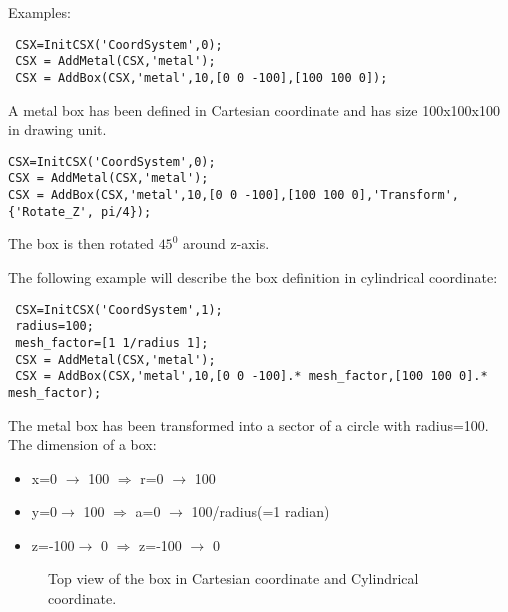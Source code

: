 \begin{FontDescr}{Examples:}

\begin{lstlisting}
 CSX=InitCSX('CoordSystem',0);
 CSX = AddMetal(CSX,'metal'); 
 CSX = AddBox(CSX,'metal',10,[0 0 -100],[100 100 0]);
\end{lstlisting} 

A metal box has been defined in Cartesian coordinate and has size 100x100x100 in drawing unit.

\begin{lstlisting}
CSX=InitCSX('CoordSystem',0);
CSX = AddMetal(CSX,'metal'); 
CSX = AddBox(CSX,'metal',10,[0 0 -100],[100 100 0],'Transform', {'Rotate_Z', pi/4});  
\end{lstlisting}  
The box is then rotated $45^{0}$ around z-axis.   


The following example will describe the box definition in cylindrical coordinate: 

\begin{lstlisting} 
 CSX=InitCSX('CoordSystem',1);
 radius=100;
 mesh_factor=[1 1/radius 1];
 CSX = AddMetal(CSX,'metal'); 
 CSX = AddBox(CSX,'metal',10,[0 0 -100].* mesh_factor,[100 100 0].* mesh_factor);
\end{lstlisting}
The metal box has been transformed into a sector of a circle with radius=100. The dimension of a box: 
\begin{itemize}
\item x=0 $\rightarrow$ 100    $\Rightarrow $   r=0 $\rightarrow$ 100

\item y=0$\rightarrow$ 100     $\Rightarrow $   a=0 $\rightarrow$ 100/radius(=1 radian)

\item z=-100$\rightarrow$ 0    $\Rightarrow $   z=-100 $\rightarrow$ 0
\end{itemize}            
\end{FontDescr}

\begin{figure}[hbt]
\centering
{}
\caption{Top view of the box in Cartesian coordinate and Cylindrical coordinate.}
\label{fig:primBox}
\end{figure}

